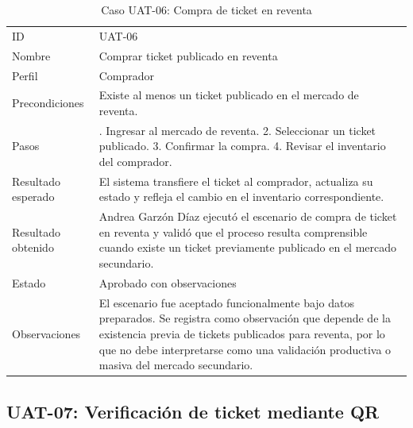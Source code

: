 \documentclass[12pt,letterpaper]{article}
\begin{document}
\begin{table}[H]
\centering
\begingroup
\footnotesize
\setlength{\tabcolsep}{3pt}
\renewcommand{\arraystretch}{1.25}

\begin{tabularx}{\textwidth}{|
>{\raggedright\arraybackslash}p{3.4cm}|
>{\raggedright\arraybackslash}X|}
\hline
\multicolumn{1}{|>{\centering\arraybackslash}m{3.4cm}|}{\textbf{Campo}} &
\multicolumn{1}{>{\centering\arraybackslash}m{10.8cm}|}{\textbf{Contenido}} \\
\hline
ID & UAT-06 \\
\hline
Nombre & Comprar ticket publicado en reventa \\
\hline
Perfil & Comprador \\
\hline
Precondiciones & Existe al menos un ticket publicado en el mercado de reventa. \\
\hline
Pasos & 1. Ingresar al mercado de reventa. 2. Seleccionar un ticket publicado. 3. Confirmar la compra. 4. Revisar el inventario del comprador. \\
\hline
Resultado esperado & El sistema transfiere el ticket al comprador, actualiza su estado y refleja el cambio en el inventario correspondiente. \\
\hline
Resultado obtenido & Andrea Garzón Díaz ejecutó el escenario de compra de ticket en reventa y validó que el proceso resulta comprensible cuando existe un ticket previamente publicado en el mercado secundario. \\
\hline
Estado & Aprobado con observaciones \\
\hline
Observaciones & El escenario fue aceptado funcionalmente bajo datos preparados. Se registra como observación que depende de la existencia previa de tickets publicados para reventa, por lo que no debe interpretarse como una validación productiva o masiva del mercado secundario. \\
\hline
\end{tabularx}

\endgroup
\caption{Caso UAT-06: Compra de ticket en reventa}
\label{tab:uat-06-compra-reventa}
\end{table}

\subsection{UAT-07: Verificación de ticket mediante QR}
\end{document}
